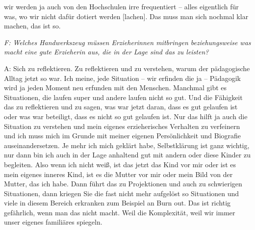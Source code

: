\begin{linenumbers*}
wir werden ja auch von den Hochschulen irre frequentiert -- alles eigentlich für was, wo wir nicht dafür dotiert werden [lachen]. Das muss man sich nochmal klar machen, das ist so.

\emph{F: Welches Handwerkszeug müssen Erzieherinnen mitbringen beziehungsweise was macht eine gute Erzieherin aus, die in der Lage sind das zu leisten?} 

A: Sich zu reflektieren. Zu reflektieren und zu verstehen, warum der pädagogische Alltag jetzt so war. Ich meine, jede Situation -- wir erfinden die ja -- Pädagogik wird ja jeden Moment neu erfunden mit den Menschen. Manchmal gibt es Situationen, die laufen super und andere laufen nicht so gut. Und die Fähigkeit das zu reflektieren und zu sagen, was war jetzt daran, dass es gut gelaufen ist oder was war beteiligt, dass es nicht so gut gelaufen ist. Nur das hilft ja auch die Situation zu verstehen und mein eigenes erzieherisches Verhalten zu verfeinern und ich muss mich im Grunde mit meiner eigenen Persönlichkeit und Biografie auseinandersetzen. Je mehr ich mich geklärt habe, Selbstklärung ist ganz wichtig, nur dann bin ich auch in der Lage anhaltend gut mit andern oder diese Kinder zu begleiten. Also wenn ich nicht weiß, ist das jetzt das Kind vor mir oder ist es mein eigenes inneres Kind, ist es die Mutter vor mir oder mein Bild von der Mutter, das ich habe. Dann führt das zu Projektionen und auch zu schwierigen Situationen, dann kriegen Sie die fast nicht mehr aufgelöst so Situationen und viele in diesem Bereich erkranken zum Beispiel an Burn out. Das ist richtig gefährlich, wenn man das nicht macht. Weil die Komplexität, weil wir immer unser eigenes familiäres spiegeln. 


\end{linenumbers*}
